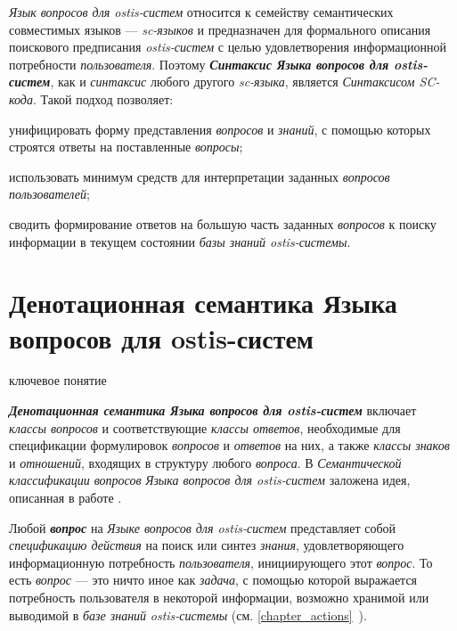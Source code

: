 \textit{Язык вопросов для ostis-систем} относится к семейству семантических совместимых языков --- \textit{sc-языков} и предназначен для формального описания поискового предписания \textit{ostis-систем} с целью удовлетворения информационной потребности \textit{пользователя}. Поэтому \textbf{\textit{Синтаксис Языка вопросов для ostis-систем}}, как и \textit{синтаксис} любого другого \textit{sc-языка}, является \textit{Синтаксисом SC-кода}. Такой подход позволяет:
\begin{textitemize}
	\item унифицировать форму представления \textit{вопросов} и \textit{знаний}, с помощью которых строятся ответы на поставленные \textit{вопросы};
	\item использовать минимум средств для интерпретации заданных \textit{вопросов пользователей};
	\item сводить формирование ответов на большую часть заданных \textit{вопросов} к поиску информации в текущем состоянии \textit{базы знаний ostis-системы}.
\end{textitemize}

\section{Денотационная семантика Языка вопросов для ostis-систем}
\label{sec_requests_den_semantics}

\begin{SCn}
\begin{scnrelfromlist}{ключевое понятие}
\end{scnrelfromlist}
\end{SCn}

\textbf{\textit{Денотационная семантика Языка вопросов для ostis-систем}} включает \textit{классы вопросов} и соответствующие \textit{классы ответов}, необходимые для спецификации формулировок \textit{вопросов} и \textit{ответов} на них, а также \textit{классы знаков} и \textit{отношений}, входящих в структуру любого \textit{вопроса}. В \textit{Семантической классификации вопросов} \textit{Языка вопросов для ostis-систем} заложена идея, описанная в работе .

Любой \textbf{\textit{вопрос}} на \textit{Языке вопросов для ostis-систем} представляет собой \textit{спецификацию действия} на поиск или синтез \textit{знания}, удовлетворяющего информационную потребность \textit{пользователя}, инициирующего этот \textit{вопрос}. То есть \textit{вопрос} --- это ничто иное как \textit{задача}, с помощью которой выражается потребность пользователя в некоторой информации, возможно хранимой или выводимой в \textit{базе знаний} \textit{ostis-системы} (см. \ref{chapter_actions}~). 

